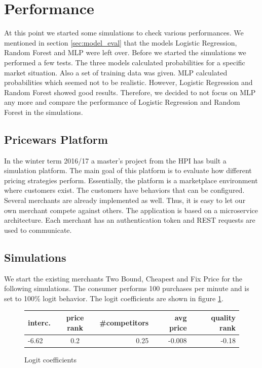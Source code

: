 \section{Performance}
\label{sec:performance}
    At this point we started some simulations to check various performances. We mentioned in section \ref{sec:model_eval} that the models Logistic Regression, Random Forest and MLP were left over. Before we started the simulations we performed a few tests. The three models calculated probabilities for a specific market situation. Also a set of training data was given. MLP calculated probabilities which seemed not to be realistic. However, Logistic Regression and Random Forest showed good results. Therefore, we decided to not focus on MLP any more and compare the performance of Logistic Regression and Random Forest in the simulations.

\subsection{Pricewars Platform}
\label{sec:platform}
    In the winter term 2016/17 a master's project from the HPI has built a simulation platform. The main goal of this platform is to evaluate how different pricing strategies perform. Essentially, the platform is a marketplace environment where customers exist. The customers have behaviors that can be configured. Several merchants are already implemented as well. Thus, it is easy to let our own merchant compete against others. The application is based on a microservice architecture. Each merchant has an authentication token and REST requests are used to communicate.

\subsection{Simulations}
    We start the existing merchants Two Bound, Cheapest and Fix Price for the following simulations. The consumer performs 100 purchases per minute and is set to 100\% logit behavior. The logit coefficients are shown in figure \ref{fig1}.
    \begin{figure}[ht]
    \centering
        \begin{tabular}{ l | c | r | r | r}
            interc. & price rank & \#competitors & avg price & quality rank \\
            \hline  
            -6.62 & 0.2 & 0.25 & -0.008 & -0.18 \\
        \end{tabular}
    \caption{Logit coefficients}
    \label{fig1}
    \end{figure}

